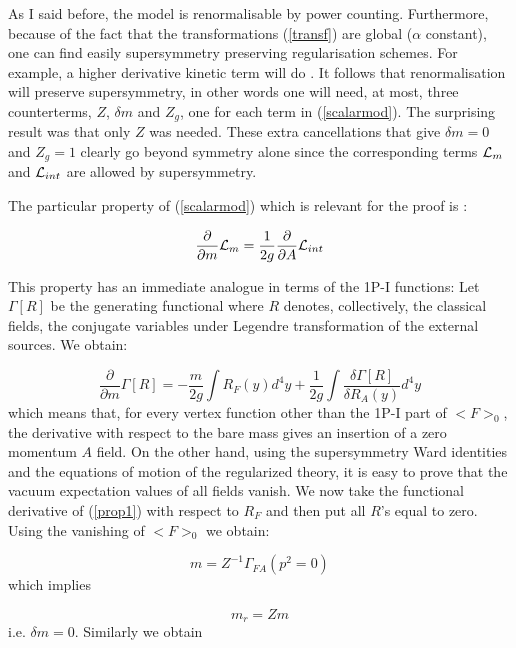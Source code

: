 \documentclass[a4paper,11pt]{article}
\begin{document}
As I said before, the model is renormalisable by power counting. Furthermore, because 
of the fact that the transformations (\ref{transf}) are global ($\alpha$ constant), 
one can find easily supersymmetry preserving regularisation schemes. 
For example, a higher derivative kinetic term will do \cite {IZ}. It follows that 
renormalisation will preserve supersymmetry, in other words one will need, at most, 
three counterterms, $Z$, ${\delta}m$ and $Z_g$, one for each term in (\ref{scalarmod}). The surprising result was that only $Z$ was needed. These extra cancellations that give  ${\delta}m = 0$ and $Z_g = 1$ clearly go beyond symmetry alone since the corresponding terms ${\cal{L}}_m$ and  ${\cal{L}}_{int}$ are allowed by supersymmetry.

The particular property of (\ref{scalarmod}) which is relevant for the proof is 
\cite {IZ}:

\begin{equation}
\label{prop}
\frac{\partial}{{\partial}m}{\cal{L}}_m = \frac{1}{2g}\frac{\partial}{\partial A}
{\cal{L}}_{int}
\end{equation}

This property has an immediate analogue in terms of the 1P-I functions: Let 
$\Gamma [R]$ be the generating functional where  $R$ denotes, collectively, the 
classical fields, the conjugate variables under Legendre transformation of the 
external sources. We obtain:

\begin{equation}
\label{prop1}
\frac{\partial}{{\partial}m} \Gamma [R] = -\frac{m}{2g} \int R_F(y)d^4 y + 
\frac{1}{2g} \int \frac{\delta \Gamma [R]}{\delta R_A (y)} d^4 y
\end{equation}
\noindent
which means that, for 
every vertex function other than the 
1P-I part of $<F>_0$, the derivative with respect to the bare mass 
gives an insertion of a zero momentum $A$ field. On the other hand, using the 
supersymmetry Ward identities and the equations of motion of the regularized theory, 
it is easy to prove \cite {IZ} that the vacuum expectation values of all fields 
vanish. We now take the functional derivative of (\ref{prop1}) with respect to 
$R_F$ and then put all $R$'s equal to zero. Using the vanishing of $<F>_0$ we 
obtain:

\begin{equation}
\label{prop2}
m = Z^{-1} \Gamma _{FA} (p^2 = 0)
\end{equation}
\noindent
which implies

\begin{equation}
\label{prop3}
m_r = Zm
\end{equation}
\noindent
i.e. ${\delta}m = 0$. Similarly we obtain
\end{document}
